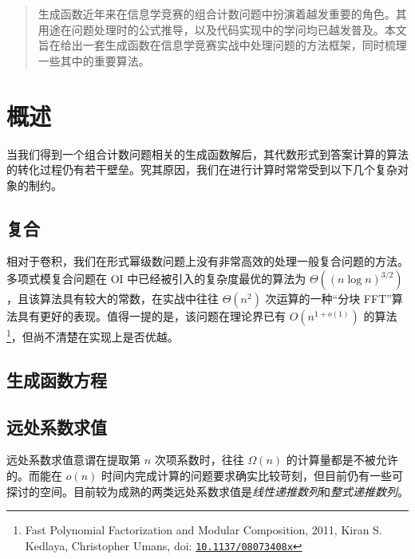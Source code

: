 \newcommand{\di}{\ensuremath{\mathrm{\,d}}}
\newcommand{\Mul}{\ensuremath{\mathsf M}}
\newcommand{\A}{\ensuremath{\mathbb A}}
\newcommand{\R}{\ensuremath{\mathsf R}}
\newcommand{\IZ}{\ensuremath{{I \backslash \{0\}}}}

\newcommand\DOI[1]{doi: \href{http://dx.doi.org/#1}{\texttt{#1}}}

\begin{abstract}
生成函数近年来在信息学竞赛的组合计数问题中扮演着越发重要的角色。其用途在问题处理时的公式推导，以及代码实现中的学问均已越发普及。本文旨在给出一套生成函数在信息学竞赛实战中处理问题的方法框架，同时梳理一些其中的重要算法。
\end{abstract}

\section{概述}

当我们得到一个组合计数问题相关的生成函数解后，其代数形式到答案计算的算法的转化过程仍有若干壁垒。究其原因，我们在进行计算时常常受到以下几个复杂对象的制约。

\subsection{复合}

相对于卷积，我们在形式幂级数问题上没有非常高效的处理一般复合问题的方法。多项式模复合问题在 OI 中已经被引入的复杂度最优的算法为 $\Theta((n\log n)^{3/2})$，且该算法具有较大的常数，在实战中往往 $\Theta(n^2)$ 次运算的一种“分块 FFT”算法具有更好的表现。值得一提的是，该问题在理论界已有 $O(n^{1+o(1)})$ 的算法\footnote{Fast Polynomial Factorization and Modular Composition, 2011, Kiran S. Kedlaya, Christopher Umans, \DOI{10.1137/08073408x}}，但尚不清楚在实现上是否优越。

\subsection{生成函数方程}

\subsection{远处系数求值}

远处系数求值意谓在提取第 $n$ 次项系数时，往往 $\Omega(n)$ 的计算量都是不被允许的。而能在 $o(n)$ 时间内完成计算的问题要求确实比较苛刻，但目前仍有一些可探讨的空间。目前较为成熟的两类远处系数求值是\emph{线性递推数列}和\emph{整式递推数列}。


